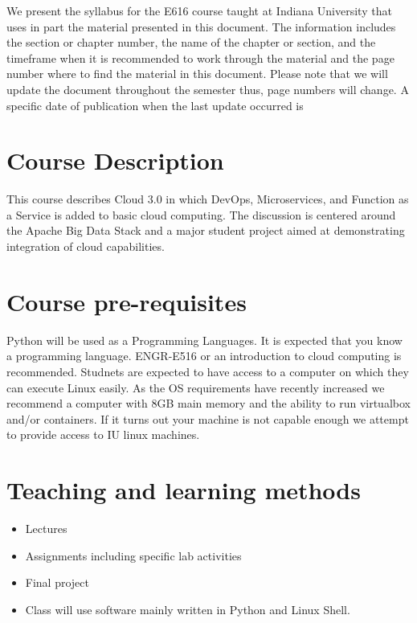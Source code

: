 \begin{itemize}
We present the syllabus for the E616 course taught at Indiana
University that uses in part the material presented in this
document. The information includes the section or chapter number, the
name of the chapter or section, and the timeframe when it is
recommended to work through the material and the page number where to
find the material in this document. Please note that we will update
the document throughout the semester thus, page numbers will change. A
specific date of publication when the last update occurred is

\TODAY

\section{Course Description }

This course describes Cloud 3.0 in which DevOps, Microservices, and
Function as a Service is added to basic cloud computing. The
discussion is centered around the Apache Big Data Stack and a major
student project aimed at demonstrating integration of cloud
capabilities.

\section{Course pre-requisites}

Python will be used as a Programming Languages. It is expected that
you know a programming language. ENGR-E516 or an introduction to cloud
computing is recommended. Studnets are expected to have access to a
computer on which they can execute Linux easily. As the OS
requirements have recently increased we recommend a computer with 8GB
main memory and the ability to run virtualbox and/or containers. If it
turns out your machine is not capable enough we attempt to provide
access to IU linux machines.

\section{Teaching and learning methods}

\begin{itemize}
\item	Lectures
\item	Assignments including specific lab activities
\item	Final project
\item Class will use software mainly written in Python
  and Linux Shell.
\end{itemize}




\end{itemize}
